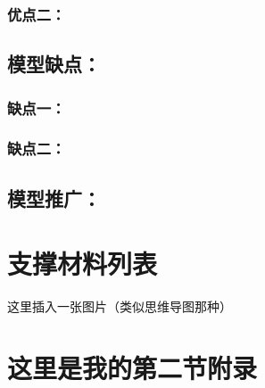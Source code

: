 \documentclass[zihao=-4,UTF8]{article}
\begin{document}
\subsubsection{优点二：}
\subsection{模型缺点：}
\subsubsection{缺点一：}
\subsubsection{缺点二：}
\subsection{模型推广：}

\nocite{*}

\thispagestyle{fancy} 


\newpage
\appendix
{}
\titleformat{\subsection}{\normalsize\bfseries}{\thesubsection}{1em}{}

\section{支撑材料列表}
\begin{center}
  这里插入一张图片（类似思维导图那种）
\end{center}
\section{这里是我的第二节附录}
\end{document}
